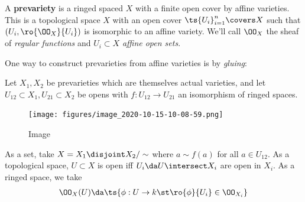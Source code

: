 \begin{definition}[Prevariety]

A \textbf{prevariety} is a ringed spaced \(X\) with a finite open cover
by affine varieties. This is a topological space \(X\) with an open
cover \(\ts{U_i}_{i=1}^n \covers X\) such that
\((U_i, \ro{\OO_X}{U_i} )\) is isomorphic to an affine variety. We'll
call \(\OO_X\) the sheaf of \emph{regular functions} and
\(U_i\subset X\) \emph{affine open sets}.

\end{definition}

One way to construct prevarieties from affine varieties is by
\emph{gluing}:

\begin{definition}

Let \(X_1, X_2\) be prevarieties which are themselves actual varieties,
and let \(U_{12} \subset X_1, U_{21} \subset X_2\) be opens with
\(f: U_{12} \to U_{21}\) an isomorphism of ringed spaces.

\begin{figure}
\centering
\texttt{[image: figures/image\_2020-10-15-10-08-59.png]}
\caption{Image}
\end{figure}

As a set, take \(X = X_1 \disjoint X_2/\sim\) where \(a\sim f(a)\) for
all \(a\in U_{12}\). As a topological space, \(U \subset X\) is open iff
\(U_i \da U\intersect X_i\) are open in \(X_i\). As a ringed space, we
take
\begin{align*}
\OO_X(U) \da \ts{\phi: U\to k \st \ro{\phi}{U_i} \in \OO_{X_i}}
\end{align*}

\end{definition}

